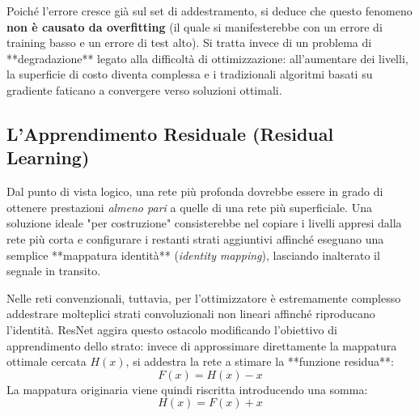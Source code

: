 ﻿\documentclass[11pt, a4paper]{article}
\begin{document}
Poiché l'errore cresce già sul set di addestramento, si deduce che questo fenomeno \textbf{non è causato da overfitting} (il quale si manifesterebbe con un errore di training basso e un errore di test alto). Si tratta invece di un problema di **degradazione** legato alla difficoltà di ottimizzazione: all'aumentare dei livelli, la superficie di costo diventa complessa e i tradizionali algoritmi basati su gradiente faticano a convergere verso soluzioni ottimali.


\subsection{L'Apprendimento Residuale (Residual Learning)}


Dal punto di vista logico, una rete più profonda dovrebbe essere in grado di ottenere prestazioni \emph{almeno pari} a quelle di una rete più superficiale. Una soluzione ideale "per costruzione" consisterebbe nel copiare i livelli appresi dalla rete più corta e configurare i restanti strati aggiuntivi affinché eseguano una semplice **mappatura identità** (\emph{identity mapping}), lasciando inalterato il segnale in transito.


Nelle reti convenzionali, tuttavia, per l'ottimizzatore è estremamente complesso addestrare molteplici strati convoluzionali non lineari affinché riproducano l'identità. ResNet aggira questo ostacolo modificando l'obiettivo di apprendimento dello strato: invece di approssimare direttamente la mappatura ottimale cercata $H(x)$, si addestra la rete a stimare la **funzione residua**:
\[ F(x) = H(x) - x \]
La mappatura originaria viene quindi riscritta introducendo una somma:
\[ \boxed{H(x) = F(x) + x} \]
\end{document}
